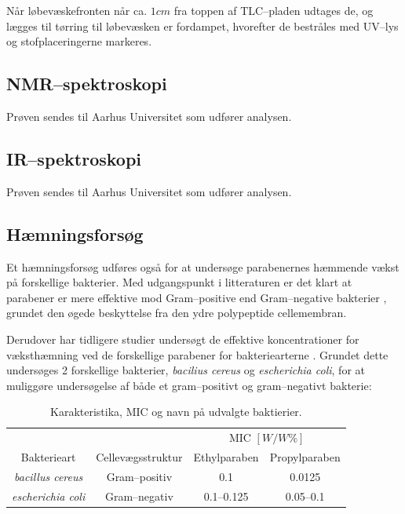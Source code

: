     Når løbevæskefronten når ca. $1\si{cm}$ fra toppen af TLC--pladen udtages de, og lægges til tørring til løbevæsken er fordampet, hvorefter de bestråles med UV--lys og stofplaceringerne markeres.

    \subsection{NMR--spektroskopi}
    Prøven sendes til Aarhus Universitet som udfører analysen.

    \subsection{IR--spektroskopi}
    Prøven sendes til Aarhus Universitet som udfører analysen.

    \subsection{Hæmningsforsøg}
    Et hæmningsforsøg udføres også for at undersøge parabenernes hæmmende vækst på forskellige bakterier. Med udgangspunkt i litteraturen er det klart at parabener er mere effektive mod Gram--positive end Gram--negative bakterier \parencite{Joao2021}, grundet den øgede beskyttelse fra den ydre polypeptide cellemembran. 

    Derudover har tidligere studier undersøgt de effektive koncentrationer for væksthæmning ved de forskellige parabener for bakteriearterne \parencite{Wies2019}. Grundet dette undersøges 2 forskellige bakterier, \textit{bacilius cereus} og \textit{escherichia coli}, for at muliggøre undersøgelse af både et gram--positivt og gram--negativt bakterie:
    \begin{table}[H]\centering
        \caption{Karakteristika, MIC og navn på udvalgte baktierier.}
        \begin{tabular}{cccc}
            \toprule
            & & \multicolumn{2}{c}{MIC $\left[\si{W\per W\%}\right]$} \\
            \cmidrule(r){3-4}
            Bakterieart & Cellevægsstruktur & Ethylparaben & Propylparaben \\
            \midrule
            \textit{bacillus cereus} & Gram--positiv & 0.1 & 0.0125 \\
            \textit{escherichia coli} & Gram--negativ & 0.1--0.125 & 0.05--0.1 \\
            \bottomrule
        \end{tabular}
    \end{table}
    
